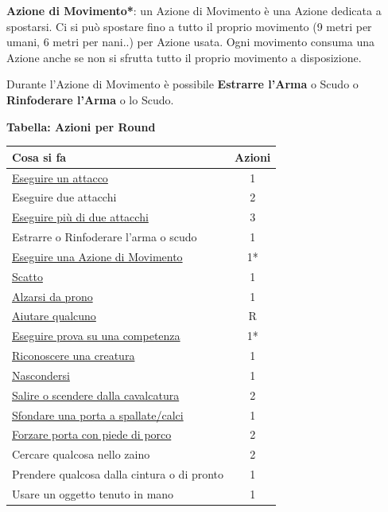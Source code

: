 \begin{multicols}{2}
\textbf{Azione di Movimento*}: un Azione di Movimento è una Azione dedicata a spostarsi. Ci si può spostare fino a tutto il proprio movimento (9 metri per umani, 6 metri per nani..) per Azione usata. Ogni movimento consuma una Azione anche se non si sfrutta tutto il proprio movimento a disposizione.

Durante l'Azione di Movimento è possibile \textbf{Estrarre l'Arma} o Scudo o \textbf{Rinfoderare l'Arma} o lo Scudo.

\medskip

\textbf{Tabella: Azioni per Round}

\medskip

\noindent\begin{tabular}{lc}
	\toprule
\textbf{Cosa si fa} & \textbf{Azioni}\\
\toprule
\hyperlink{tiropercolpireedifesa}{Eseguire un attacco}& 1\\
Eseguire due attacchi& 2\\
\hyperlink{attacchimultiplimischia}{Eseguire più di due attacchi}& 3\\
Estrarre o Rinfoderare l'arma o scudo& 1\\
\midrule
\hyperlink{tipodimovimento}{Eseguire una Azione di Movimento} &1*\\
\hyperlink{azionediscatto}{Scatto} & 1\\
\hyperlink{alzarsidaprono}{Alzarsi da prono}& 1\\
\midrule
\hyperlink{aiutare}{Aiutare qualcuno}& R\\
\hyperlink{esempiprovecompetenze}{Eseguire prova su una competenza}& 1*\\
\hyperlink{riconosceremostro}{Riconoscere una creatura}& 1\\
\hyperlink{copertura}{Nascondersi}& 1\\
\midrule
\hyperlink{cavalcare}{Salire o scendere dalla cavalcatura}& 2\\
\hyperlink{sfondare}{Sfondare una porta a spallate/calci}& 1\\
\hyperlink{piedediporco}{Forzare porta con piede di porco}& 2\\
\midrule
Cercare qualcosa nello zaino& 2\\
{\small Prendere qualcosa dalla cintura o di pronto} & 1\\
Usare un oggetto tenuto in mano& 1\\

\end{tabular}
\end{multicols}
